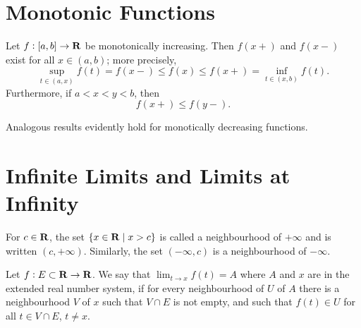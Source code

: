 \section{Monotonic Functions}
\begin{proposition}
Let $f:[a,b]\to\mathbf R$ be monotonically increasing. Then $f(x+)$ and $f(x-)$ exist for all $x\in(a,b)$; more precisely,
\[\sup_{t\in(a,x)}f(t)=f(x-)\le f(x)\le f(x+)=\inf_{t\in(x,b)}f(t).\]
Furthermore, if $a<x<y<b$, then
\[f(x+)\le f(y-).\]
\end{proposition}

Analogous results evidently hold for monotically decreasing functions.

\section{Infinite Limits and Limits at Infinity}
\begin{definition}
For $c\in\mathbf R$, the set $\{x\in\mathbf R\mid x>c\}$ is called a neighbourhood of $+\infty$ and is written $(c,+\infty)$. Similarly, the set $(-\infty,c)$ is a neighbourhood of $-\infty$.
\end{definition}

\begin{definition}
Let $f:E\subset\mathbf R\to\mathbf R$. We say that $\displaystyle\lim_{t\to x}f(t)=A$ where $A$ and $x$ are in the extended real number system, if for every neighbourhood of $U$ of $A$ there is a neighbourhood $V$ of $x$ such that $V\cap E$ is not empty, and such that $f(t)\in U$ for all $t\in V\cap E$, $t\neq x$.
\end{definition}